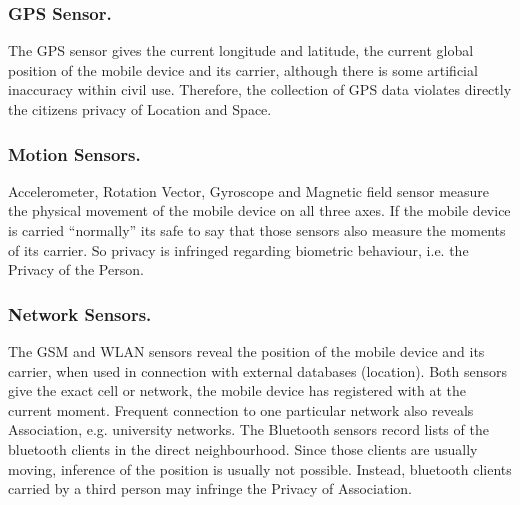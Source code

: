 \documentclass[runningheads,a4paper]{llncs}
\begin{document}
\subsubsection{GPS Sensor.}
The GPS sensor gives the current longitude and latitude, the current global position of the mobile device and its carrier, although there is some artificial inaccuracy within civil use. Therefore, the collection of GPS data violates directly the citizens privacy of Location and Space.


\subsubsection{Motion Sensors.}
Accelerometer, Rotation Vector, Gyroscope and Magnetic field sensor measure the physical movement of the mobile device on all three axes.
If the mobile device is carried ``normally'' its safe to say that those sensors also measure the moments of its carrier.
So privacy is infringed regarding biometric behaviour, i.e. the Privacy of the Person.


\subsubsection{Network Sensors.}
The GSM and WLAN sensors reveal the position of the mobile device and its carrier, when used in connection with external databases (location).
Both sensors give the exact cell or network, the mobile device has registered with at the current moment.
Frequent connection to one particular network also reveals Association, e.g. university networks. The Bluetooth sensors record lists of the bluetooth clients in the direct neighbourhood.
Since those clients are usually moving, inference of the position is usually not possible.
Instead, bluetooth clients carried by a third person may infringe the Privacy of Association.

\end{document}
